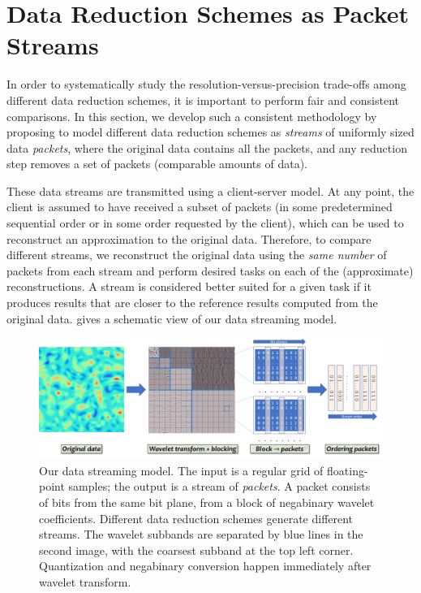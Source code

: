 \section{Data Reduction Schemes as Packet Streams}\label{sec:terminologies}

In order to systematically study the resolution-versus-precision trade-offs among different data
reduction schemes, it is important to perform fair and consistent comparisons. In this section, we
develop such a consistent methodology by proposing to model different data reduction schemes as
\emph{streams} of uniformly sized data \emph{packets}, where the original data contains all the
packets, and any reduction step removes a set of packets (comparable amounts of data).

These data streams are transmitted using a client-server model. At any point, the client is assumed
to have received a subset of packets (in some predetermined sequential order or in some order
requested by the client), which can be used to reconstruct an approximation to the original data.
Therefore, to compare different streams, we reconstruct the original data using the \emph{same
number} of packets from each stream and perform desired tasks on each of the (approximate)
reconstructions. A stream is considered better suited for a given task if it produces results that
are closer to the reference results computed from the original data.  gives a
schematic view of our data streaming model.

\begin{figure}[!b]
\vspace{-1em}
\centering
\includegraphics[width=\linewidth]{img/pipeline.png}
\vspace{-1em}
\caption{Our data streaming model. The input is a regular grid of floating-point samples;
the output is a stream of \emph{packets}. A packet consists of bits from the same bit plane, from a
block of negabinary wavelet coefficients. Different data reduction schemes generate different
streams.  The wavelet subbands are separated by blue lines in the second image, with the coarsest
subband at the top left corner. 
Quantization and negabinary conversion
happen immediately after wavelet transform.
}\label{fig:pipeline}
\end{figure}


